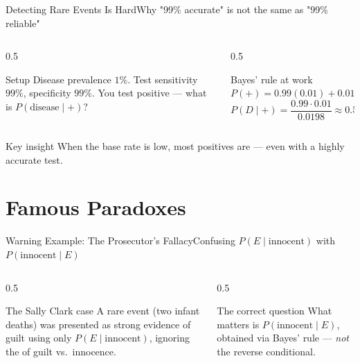 \documentclass[aspectratio=169,11pt]{beamer}
\begin{document}
\begin{frame}{Detecting Rare Events Is Hard}{Why "99\% accurate" is not the same as "99\% reliable"}
  \begin{columns}[T]
    \begin{column}{0.5\textwidth}
      \begin{block}{Setup}
        \small Disease prevalence $1\%$. Test sensitivity $99\%$,
        specificity $99\%$. You test positive — what is $P(\text{disease}\mid+)$?
      \end{block}
    \end{column}
    \begin{column}{0.5\textwidth}
      \begin{exampleblock}{Bayes' rule at work}
        \small $P(+) = 0.99(0.01) + 0.01(0.99) = 0.0198$
        \[ P(D\mid+) = \frac{0.99\cdot0.01}{0.0198} \approx 0.50 \]
      \end{exampleblock}
    \end{column}
  \end{columns}
  \vfill
  \begin{alertblock}{Key insight}
    \small When the base rate is low, most positives are  — even with a highly accurate test.
  \end{alertblock}
\end{frame}

\section{Famous Paradoxes}

\begin{frame}{Warning Example: The Prosecutor's Fallacy}{Confusing $P(E\mid \text{innocent})$ with $P(\text{innocent}\mid E)$}
  \begin{columns}[T]
    \begin{column}{0.5\textwidth}
      \begin{alertblock}{The Sally Clark case}
        \small A rare event (two infant deaths) was presented as strong
        evidence of guilt using only $P(E\mid\text{innocent})$, ignoring
        the  of guilt vs.\ innocence.
      \end{alertblock}
    \end{column}
    \begin{column}{0.5\textwidth}
      \begin{exampleblock}{The correct question}
        \small What matters is $P(\text{innocent}\mid E)$, obtained via
        Bayes' rule — \emph{not} the reverse conditional.
      \end{exampleblock}
    \end{column}
  \end{columns}
\end{frame}
\end{document}
